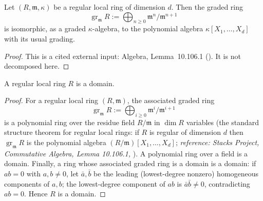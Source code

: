 \begin{lemma}
\label{lem:pcb-regular-graded-polynomial}
Let \((R,\mathfrak m,\kappa)\) be a regular local ring of dimension \(d\).
Then the graded ring
\[
 \operatorname{gr}_{\mathfrak m}R
 :=\bigoplus_{n\geq0}\mathfrak m^n/\mathfrak m^{n+1}
\]
is isomorphic, as a graded \(\kappa\)-algebra, to the polynomial algebra
\(\kappa[X_1,\dots,X_d]\) with its usual grading.
\end{lemma}
\begin{proof}
This is a cited external input: Algebra, Lemma~10.106.1
().  It is not decomposed here.
\end{proof}

\begin{lemma}
\label{lem:pcb-regular-local-domain}
A regular local ring \(R\) is a domain.
\end{lemma}
\begin{proof}
For a regular local ring \((R,\mathfrak m)\), the associated graded
ring
\[
 \operatorname{gr}_{\mathfrak m}R
 :=\bigoplus_{i\geq0}\mathfrak m^i/\mathfrak m^{i+1}
\]
is a polynomial ring over the residue field \(R/\mathfrak m\) in
\(\dim R\) variables (the standard structure theorem for regular
local rings: if \(R\) is regular of dimension \(d\) then
\(\operatorname{gr}_{\mathfrak m}R\) is the polynomial algebra
\((R/\mathfrak m)[X_1,\dots,X_d]\);
\emph{reference: Stacks Project, Commutative Algebra, Lemma
10.106.1, }).  A polynomial ring over a field is a domain.
Finally, a ring whose associated graded ring is a domain is a
domain: if \(ab=0\) with \(a,b\neq0\), let \(\bar a,\bar b\) be
the leading (lowest-degree nonzero) homogeneous components of
\(a,b\); the lowest-degree component of \(ab\) is
\(\bar a\bar b\neq0\), contradicting \(ab=0\).  Hence \(R\) is a
domain.
\end{proof}

